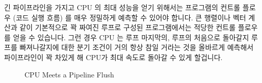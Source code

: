 긴 파이프라인을 가지고 CPU 의 최대 성능을 얻기 위해서는 프로그램의 컨트롤
플로우 (코드 실행 흐름) 를 매우 정밀하게 예측할 수 있어야 합니다.
큰 행렬이나 벡터 계산과 같이 기본적으로 꽉 짜여진 루프로 구성된 프로그램에서는
적당한 컨트롤 플로우를 얻을 수 있습니다.
그런 경우 CPU 는 루프 마지막의, 루프의 처음으로 돌아갈지 루프를 빠져나갈지에
대한 분기  조건이 거의 항상 참일 거라는 것을 올바르게 예측해서 파이프라인이
꽉 차있게 해 CPU가 최대 속도로 돌아갈 수 있게 할겁니다.

\begin{figure}[tb]
\centering
{}
\caption{CPU Meets a Pipeline Flush}
\end{figure}

